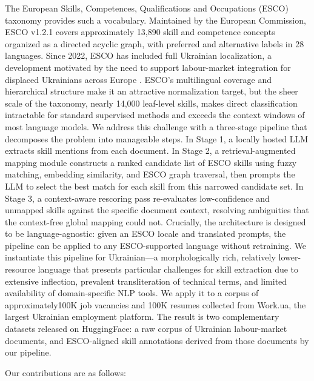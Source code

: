 \documentclass[11pt]{article}
\begin{document}
The European Skills, Competences, Qualifications and Occupations (ESCO) taxonomy provides such a vocabulary. Maintained by the European Commission, ESCO v1.2.1 covers approximately 13,890 skill and competence concepts organized as a directed acyclic graph, with preferred and alternative labels in 28 languages. Since 2022, ESCO has included full Ukrainian localization, a development motivated by the need to support labour-market integration for displaced Ukrainians across Europe \citep{EuroComission2022}. ESCO’s multilingual coverage and hierarchical structure make it an attractive normalization target, but the sheer scale of the taxonomy, nearly 14,000 leaf-level skills, makes direct classification intractable for standard supervised methods and exceeds the context windows of most language models.
We address this challenge with a three-stage pipeline that decomposes the problem into manageable steps. In Stage 1, a locally hosted LLM extracts skill mentions from each document. In Stage 2, a retrieval-augmented mapping module constructs a ranked candidate list of ESCO skills using fuzzy matching, embedding similarity, and ESCO graph traversal, then prompts the LLM to select the best match for each skill from this narrowed candidate set. In Stage 3, a context-aware rescoring pass re-evaluates low-confidence and unmapped skills against the specific document context, resolving ambiguities that the context-free global mapping could not. Crucially, the architecture is designed to be language-agnostic: given an ESCO locale and translated prompts, the pipeline can be applied to any ESCO-supported language without retraining.
We instantiate this pipeline for Ukrainian—a morphologically rich, relatively lower-resource language that presents particular challenges for skill extraction due to extensive inflection, prevalent transliteration of technical terms, and limited availability of domain-specific NLP tools. We apply it to a corpus of approximately100K job vacancies and 100K resumes collected from Work.ua, the largest Ukrainian employment platform. The result is two complementary datasets released on HuggingFace: a raw corpus of Ukrainian labour-market documents, and ESCO-aligned skill annotations derived from those documents by our pipeline.

Our contributions are as follows:
\end{document}
